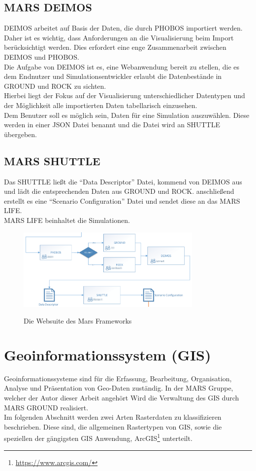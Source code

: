 \documentclass[10pt,conference,compsocconf]{IEEEtran}
\begin{document}
\subsection{MARS DEIMOS}
\label{sub:deimos}
DEIMOS arbeitet auf Basis der Daten, die durch PHOBOS importiert werden. Daher ist es wichtig, dass Anforderungen an die Visualisierung beim Import berücksichtigt werden. Dies erfordert eine enge Zusammenarbeit zwischen DEIMOS und PHOBOS.\\
Die Aufgabe von DEIMOS ist es, eine Webanwendung bereit zu stellen, die es dem Endnutzer und Simulationsentwickler erlaubt die Datenbestände in GROUND und ROCK zu sichten.\\
Hierbei liegt der Fokus auf der Visualisierung unterschiedlicher Datentypen und der Möglichkeit alle importierten Daten tabellarisch einzusehen.\\
Dem Benutzer soll es möglich sein, Daten für eine Simulation auszuwählen. Diese werden in einer JSON Datei benannt und die Datei wird an SHUTTLE übergeben.

\subsection{MARS SHUTTLE}
Das SHUTTLE ließt die \enquote{Data Descriptor} Datei, kommend von DEIMOS aus und lädt die entsprechenden Daten aus GROUND und ROCK. anschließend erstellt es eine \enquote{Scenario Configuration} Datei und sendet diese an das MARS LIFE.\\
MARS LIFE beinhaltet die Simulationen.

\begin{figure}[H]
  \centering
  	\includegraphics[height=114pt]{img/mars_websuite}\\
  \caption[]{Die Websuite des Mars Frameworks}
  \label{img:mars_websuite}
\end{figure}

\section{Geoinformationssystem (GIS)}
Geoinformationssysteme sind für die Erfassung, Bearbeitung, Organisation, Analyse und Präsentation von Geo-Daten zuständig. In der MARS Gruppe, welcher der Autor dieser Arbeit angehört Wird die Verwaltung des GIS durch MARS GROUND realisiert.\\
Im folgenden Abschnitt werden zwei Arten Rasterdaten zu klassifizieren beschrieben. Diese sind, die allgemeinen Rastertypen von GIS, sowie die speziellen der gängigsten GIS Anwendung, ArcGIS\footnote{\url{https://www.arcgis.com/}} unterteilt.
\end{document}
